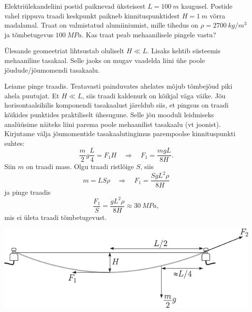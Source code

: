 
Elektriülekandeliini postid paiknevad üksteisest $L = \SI{100}{m}$ kaugusel. Postide vahel rippuva traadi keskpunkt paikneb kinnituspunktidest $H = \SI{1}{m}$ võrra madalamal. Traat on valmistatud alumiiniumist, mille tihedus on $\rho = \SI{2700}{kg/m^3}$ ja tõmbetugevus $\SI{100}{MPa}$. Kas traat peab mehaanilisele pingele vastu?

\hint
Ülesande geomeetriat lihtsustab oluliselt $H \ll L$. Lisaks kehtib süsteemis mehaaniline tasakaal. Selle jaoks on mugav vaadelda liini ühe poole jõudude/jõumomendi tasakaalu.

\solu
Leiame pinge traadis. Teatavasti painduvates ahelates mõjub tõmbejõud piki ahela puutujat. Et $H \ll L$, siis traadi kaldenurk on kõikjal väga väike. Jõu horisontaalsihilis komponendi tasakaalust järeldub siis, et pingsus on traadi kõikides punktides praktiliselt ühesugune. Selle jõu mooduli leidmiseks analüüsime näiteks liini parema poole mehaanilist tasakaalu (vt joonist). Kirjutame välja jõumomentide tasakaalutingimus parempoolse kinnituspunkti suhtes:
$$
\frac{m}{2} g \frac{L}{4}=F_{1} H \quad \Rightarrow \quad F_{1}=\frac{m g L}{8 H} .
$$
Siin $m$ on traadi mass. Olgu traadi ristlõige $S$, siis
$$
m=L S \rho \quad \Rightarrow \quad F_{1}=\frac{S g L^{2} \rho}{8 H}
$$
ja pinge traadis
$$
\frac{F_{1}}{S}=\frac{g L^{2} \rho}{8 H} \approx \SI{30}{MPa},
$$
mis ei ületa traadi tõmbetugevust.
\begin{center}
	\includegraphics[width=\linewidth]{2004-lahg-10-lah.pdf}
\end{center}

\probend